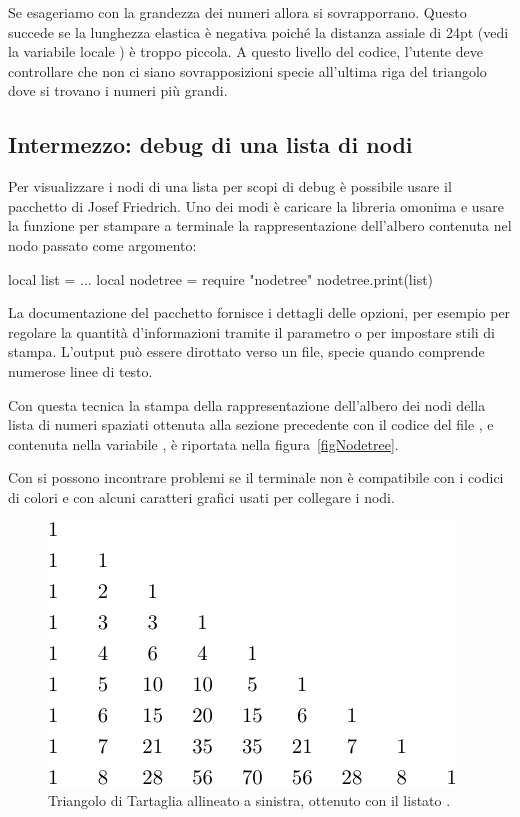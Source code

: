 Se esageriamo con la grandezza dei numeri allora si sovrapporrano. Questo
succede se la lunghezza elastica è negativa poiché la distanza assiale di 24pt
(vedi la variabile locale ) è troppo piccola. A questo livello del
codice, l'utente deve controllare che non ci siano sovrapposizioni specie
all'ultima riga del triangolo dove si trovano i numeri più grandi.


\subsection{Intermezzo: debug di una lista di nodi}

Per visualizzare i nodi di una lista per scopi di debug è possibile usare il
pacchetto  di Josef Friedrich. Uno dei modi è caricare la
libreria omonima e usare la funzione 
per stampare a terminale la rappresentazione dell'albero contenuta nel nodo
passato come argomento:
\begin{lines}
local list = ...
local nodetree = require "nodetree"
nodetree.print(list)
\end{lines}

La documentazione del pacchetto fornisce i dettagli delle opzioni, per esempio
per regolare la quantità d'informazioni tramite il parametro  o
per impostare stili di stampa. L'output può essere dirottato verso un file,
specie quando comprende numerose linee di testo.

Con questa tecnica la stampa della rappresentazione dell'albero dei nodi della
lista di numeri spaziati ottenuta alla sezione precedente con il codice del file
, e contenuta nella variabile , è riportata nella
figura~\ref{figNodetree}.

Con  si possono incontrare problemi se il terminale non è
compatibile con i codici di colori e con alcuni caratteri grafici usati per
collegare i nodi.


\begin{figure}[b]
\centering
\includegraphics{image/tart-left}
\caption{Triangolo di Tartaglia allineato a sinistra, ottenuto con il listato
.}
\label{figTriangoloTartagliaLeft}
\end{figure}

